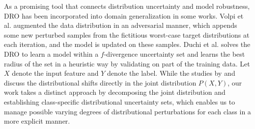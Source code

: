 \documentclass[journal]{IEEEtran}
\begin{document}
As a promising tool that connects distribution uncertainty and model robustness, DRO has been incorporated into domain generalization in some works.
Volpi et al. \cite{volpi2018generalizing} augmented the data distribution in an adversarial manner, which appends some new perturbed samples from the fictitious worst-case target distributions at each iteration, and the model is updated on these samples. 
Duchi et al. \cite{duchi2021learning} solves the DRO to learn a model within a $f$-divergence uncertainty set and learns the best radius of the set in a heuristic way by validating on part of the training data.
Let $X$ denote the input feature and $Y$ denote the label.
While the studies by \cite{volpi2018generalizing} and \cite{duchi2021learning} discuss the distributional shifts directly in the joint distribution $P(X, Y)$, 
our work takes a distinct approach by decomposing the joint distribution and establishing class-specific distributional uncertainty sets, which enables us to manage possible varying degrees of distributional perturbations for each class in a more explicit manner.
\end{document}
